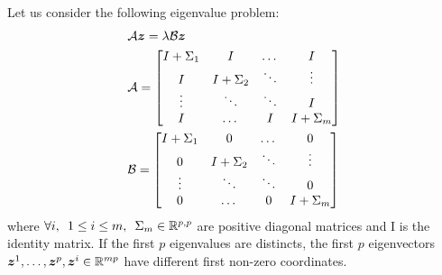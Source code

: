 \begin{lemma}
\label{lemma:nonzerocoord}
Let us consider the following eigenvalue problem:
 \begin{align}
  &  \mathcal{A} \boldsymbol{z} = \lambda \mathcal{B} \boldsymbol{z}
    \label{reducedeig}
   \\
   \nonumber
   &\mathcal{A} = \begin{bmatrix} I + \Sigma_1 & I & \dots & I \\
     I & I + \Sigma_2 & \ddots & \vdots \\
     \vdots &  \ddots & \ddots & I  \\
     I & \dots & I  &I + \Sigma_m
   \end{bmatrix} \\
   \nonumber
   &\mathcal{B} = \begin{bmatrix}
     I + \Sigma_1 & 0 & \dots  & 0 \\
     0 & I + \Sigma_2 & \ddots & \vdots \\
     \vdots & \ddots & \ddots & 0 \\
     0& \dots  & 0 &  I + \Sigma_m  \\
   \end{bmatrix}
\end{align}
where $\forall i, \enspace 1 \leq i \leq m, \enspace  \Sigma_m \in \mathbb{R}^{p, p}$ are positive diagonal matrices and I is the identity matrix.
If the first $p$ eigenvalues are distincts, the first $p$ eigenvectors $\boldsymbol{z}^1, \dots, \boldsymbol{z}^p, \boldsymbol{z}^i \in \mathbb{R}^{mp}$ have different first non-zero coordinates.
\end{lemma}
